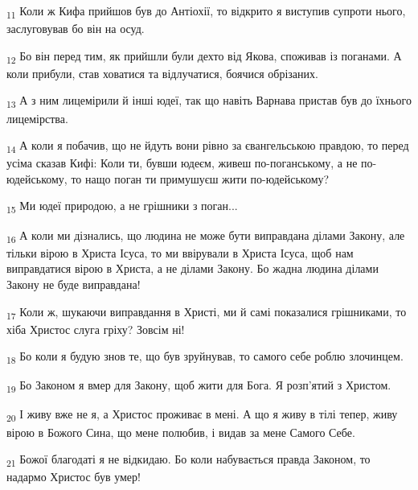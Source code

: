 \begin{tcolorbox}
\textsubscript{11} Коли ж Кифа прийшов був до Антіохії, то відкрито я виступив супроти нього, заслуговував бо він на осуд.
\end{tcolorbox}
\begin{tcolorbox}
\textsubscript{12} Бо він перед тим, як прийшли були дехто від Якова, споживав із поганами. А коли прибули, став ховатися та відлучатися, боячися обрізаних.
\end{tcolorbox}
\begin{tcolorbox}
\textsubscript{13} А з ним лицемірили й інші юдеї, так що навіть Варнава пристав був до їхнього лицемірства.
\end{tcolorbox}
\begin{tcolorbox}
\textsubscript{14} А коли я побачив, що не йдуть вони рівно за євангельською правдою, то перед усіма сказав Кифі: Коли ти, бувши юдеєм, живеш по-поганському, а не по-юдейському, то нащо поган ти примушуєш жити по-юдейському?
\end{tcolorbox}
\begin{tcolorbox}
\textsubscript{15} Ми юдеї природою, а не грішники з поган...
\end{tcolorbox}
\begin{tcolorbox}
\textsubscript{16} А коли ми дізнались, що людина не може бути виправдана ділами Закону, але тільки вірою в Христа Ісуса, то ми ввірували в Христа Ісуса, щоб нам виправдатися вірою в Христа, а не ділами Закону. Бо жадна людина ділами Закону не буде виправдана!
\end{tcolorbox}
\begin{tcolorbox}
\textsubscript{17} Коли ж, шукаючи виправдання в Христі, ми й самі показалися грішниками, то хіба Христос слуга гріху? Зовсім ні!
\end{tcolorbox}
\begin{tcolorbox}
\textsubscript{18} Бо коли я будую знов те, що був зруйнував, то самого себе роблю злочинцем.
\end{tcolorbox}
\begin{tcolorbox}
\textsubscript{19} Бо Законом я вмер для Закону, щоб жити для Бога. Я розп'ятий з Христом.
\end{tcolorbox}
\begin{tcolorbox}
\textsubscript{20} І живу вже не я, а Христос проживає в мені. А що я живу в тілі тепер, живу вірою в Божого Сина, що мене полюбив, і видав за мене Самого Себе.
\end{tcolorbox}
\begin{tcolorbox}
\textsubscript{21} Божої благодаті я не відкидаю. Бо коли набувається правда Законом, то надармо Христос був умер!
\end{tcolorbox}
